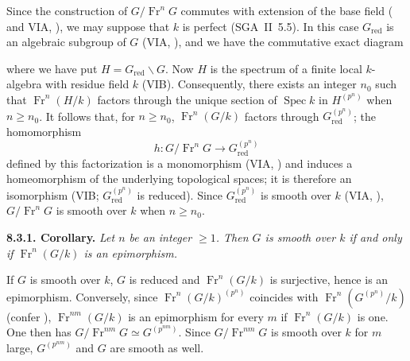 Since the construction of \(G/\operatorname{Fr}^nG\) commutes with
extension of the base field ( and VIA, ), we may suppose
that \(k\) is perfect (SGA~II~5.5). In this case \(G_{\mathrm{red}}\) is
an algebraic subgroup of \(G\) (VIA, ), and we have the commutative
exact diagram
\begin{center}
  \label{sga3:VIIA:8.3-reduced-quotient-frobenius-diagram}
  
\end{center}
where we have put \(H=G_{\mathrm{red}}\backslash G\). Now \(H\) is the
spectrum of a finite local \(k\)-algebra with residue field \(k\) (VIB).
Consequently, there exists an integer \(n_0\) such that
\(\operatorname{Fr}^n(H/k)\) factors through the unique section of
\(\operatorname{Spec}k\) in \(H^{(p^n)}\) when \(n\ge n_0\). It follows
that, for \(n\ge n_0\), \(\operatorname{Fr}^n(G/k)\) factors through
\(G_{\mathrm{red}}^{(p^n)}\); the homomorphism
\[
  h:G/\operatorname{Fr}^nG\longrightarrow G_{\mathrm{red}}^{(p^n)}
\]
defined by this factorization is a monomorphism (VIA, ) and
induces a homeomorphism of the underlying topological spaces; it is
therefore an isomorphism (VIB; \(G_{\mathrm{red}}^{(p^n)}\) is reduced).
Since \(G_{\mathrm{red}}^{(p^n)}\) is smooth over \(k\)
(VIA, ), \(G/\operatorname{Fr}^nG\) is smooth over \(k\) when
\(n\ge n_0\).

\medskip
\noindent\textbf{8.3.1. Corollary.}
\label{sga3:VIIA:8.3.1}
\textit{Let \(n\) be an integer \(\geq1\). Then \(G\) is smooth over \(k\)
if and only if \(\operatorname{Fr}^n(G/k)\) is an epimorphism.}

If \(G\) is smooth over \(k\), \(G\) is reduced and
\(\operatorname{Fr}^n(G/k)\) is surjective, hence is an epimorphism.
Conversely, since \(\operatorname{Fr}^n(G/k)^{(p^n)}\) coincides with
\(\operatorname{Fr}^n(G^{(p^n)}/k)\) (confer ),
\(\operatorname{Fr}^{nm}(G/k)\) is an epimorphism for every \(m\) if
\(\operatorname{Fr}^n(G/k)\) is one. One then has
\(G/\operatorname{Fr}^{nm}G\simeq G^{(p^{nm})}\). Since
\(G/\operatorname{Fr}^{nm}G\) is smooth over \(k\) for \(m\) large,
\(G^{(p^{nm})}\) and \(G\) are smooth as well.

